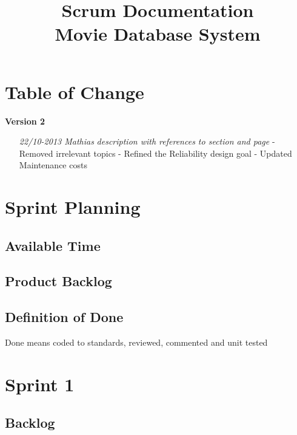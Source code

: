 \documentclass[]{report}
\title{Scrum Documentation \\ Movie Database System}
\author{}
\begin{document}
\maketitle

\chapter*{Table of Change}


\hspace{-2cm}\textbf{Version 2}
 \begin{itemize}
\item[\textit{22/10-2013 Mathias}] \hspace{0.5cm}
\textit{description with references to section and page }
\subitem - Removed irrelevant topics
\subitem - Refined the Reliability design goal
\subitem - Updated Maintenance costs

\vspace{0.4cm}

\end{itemize}


\chapter*{Sprint Planning}



\section{Available Time}
\label{sec:Available Time}


\section{Product Backlog}
\label{sec:Product Backlog}



\section{Definition of Done}
\label{sec:Definition of Done}
Done means coded to standards, reviewed, commented and unit tested


\newpage
\chapter{Sprint 1}
\label{chap:Spring 1}

\section{Backlog}
\end{document}
